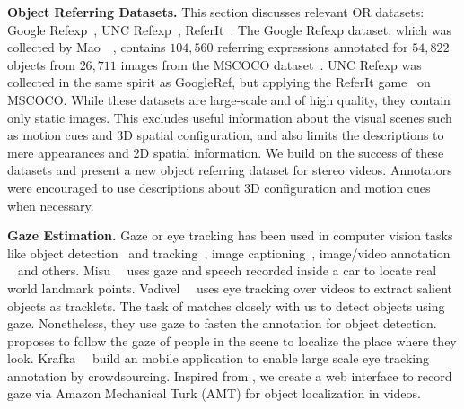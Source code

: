 \documentclass[10pt,twocolumn,letterpaper]{article}
\begin{document}
\bigskip
\noindent
\textbf{Object Referring Datasets.} 
This section discusses relevant OR datasets:    
Google Refexp~\cite{mao2016generation}, UNC Refexp~\cite{yu2016modeling}, ReferIt~\cite{kazemzadeh2014referitgame}. 
The Google Refexp dataset, which was collected by Mao~\etal~\cite{mao2016generation}, contains $104,560$ referring expressions annotated for $54,822$ objects from $26,711$ images from the MSCOCO dataset~\cite{lin2014microsoft}. UNC Refexp was collected in the same spirit as GoogleRef, but applying the ReferIt game~\cite{kazemzadeh2014referitgame} on MSCOCO. While these datasets are large-scale and of high quality, they contain only static images. This excludes useful information about the visual scenes such as motion cues and 3D spatial configuration, and also limits the descriptions to mere appearances and 2D spatial information. We build on the success of these datasets and present a new object referring dataset for stereo videos. Annotators were encouraged to use descriptions about 3D configuration and motion cues when necessary. 

\bigskip
\noindent
\textbf{Gaze Estimation.} Gaze or eye tracking has been used in computer vision tasks like object detection~\cite{karthikeyan2013and,yun2013studying} and tracking~\cite{Vadivel_2015_CVPR}, image captioning~\cite{sugano2016seeing}, image/video annotation ~\cite{Vadivel_2015_CVPR,papadopoulos2014training,soliman2016towards} and others. Misu~\etal~\cite{misu2013situated} uses gaze and speech recorded inside a car to locate real world landmark points. Vadivel~\etal~\cite{Vadivel_2015_CVPR} uses eye tracking over videos to extract salient objects as tracklets. The task of \cite{papadopoulos2014training} matches closely with us to detect objects using gaze. Nonetheless, they use gaze to fasten the annotation for object detection. \cite{nips15_recasens} proposes to follow the gaze of people in the scene to localize the place where they look. Krafka~\etal~\cite{krafka2016eye} build an mobile application to enable large scale eye tracking annotation by crowdsourcing. Inspired from \cite{krafka2016eye}, we create a web interface to record gaze via Amazon Mechanical Turk (AMT) for object localization in videos. 
\end{document}
